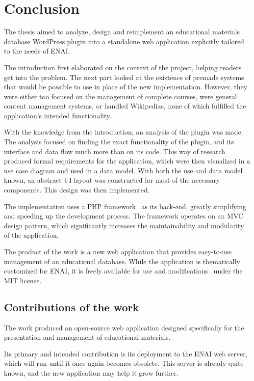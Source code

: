 \documentclass[
  digital,     %
  oneside,     %
  nosansbold,  %
  colorbold, %
  lof,         %
  lot,         %
]{fithesis4}
\begin{document}
\chapter{Conclusion}

The thesis aimed to analyze, design and reimplement an educational materials database WordPress plugin into a standalone web application explicitly tailored to the needs of ENAI.

The introduction first elaborated on the context of the project, helping readers get into the problem. The next part looked at the existence of premade systems that would be possible to use in place of the new implementation. However, they were either too focused on the management of complete courses, were general content management systems, or handled Wikipedias, none of which fulfilled the application's intended functionality.

With the knowledge from the introduction, an analysis of the plugin was made. The analysis focused on finding the exact functionality of the plugin, and its interface and data flow much more than on its code. This way of research produced formal requirements for the application, which were then visualized in a use case diagram and used in a data model. With both the use and data model known, an abstract UI layout was constructed for most of the necessary components. This design was then implemented.

The implementation uses a PHP framework~\cite{codeigniter4} as its back-end, greatly simplifying and speeding up the development process. The framework operates on an MVC design pattern, which significantly increases the maintainability and modularity of the application.

The product of the work is a new web application that provides easy-to-use management of an educational database. While the application is thematically customized for ENAI, it is freely available for use and modifications~\cite{repository} under the MIT license.

\section{Contributions of the work}

The work produced an open-source web application designed specifically for the presentation and management of educational materials. 

Its primary and intended contribution is its deployment to the ENAI web server, which will run until it once again becomes obsolete. This server is already quite known, and the new application may help it grow further.
\end{document}
